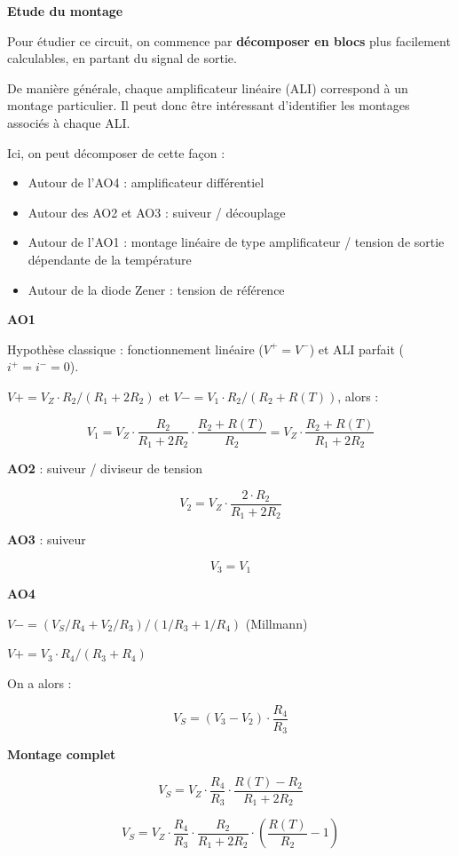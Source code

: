 \documentclass[a4paper,french]{paper}
\begin{document}

\textbf{Etude du montage}

Pour étudier ce circuit, on commence par \textbf{décomposer en blocs} plus facilement calculables, en partant du signal de sortie.

De manière générale, chaque amplificateur linéaire (ALI) correspond à un montage particulier. Il peut donc être intéressant d'identifier les montages associés à chaque ALI.

Ici, on peut décomposer de cette façon : 
\begin{itemize}
	\item Autour de l'AO4 : amplificateur différentiel 
	\item Autour des AO2 et AO3 : suiveur / découplage
	\item Autour de l'AO1 : montage linéaire de type amplificateur / tension de sortie dépendante de la température
	\item Autour de la diode Zener : tension de référence	
\end{itemize}


\textbf{AO1} 

Hypothèse classique : fonctionnement linéaire ($V^+ = V^-$) et ALI parfait ($i^+ = i^- = 0$).

$V+ = V_Z \cdot R_2 / (R_1 + 2 R_2)$ et $V- = V_1 \cdot R_2 / (R_2 + R(T))$, alors : 

$$V_1 = V_Z \cdot \frac{R_2}{R_1 + 2 R_2} \cdot \frac{R_2 + R(T)}{R_2} = V_Z \cdot \frac{R_2 + R(T)}{R_1 + 2 R_2}$$

\textbf{AO2} : suiveur / diviseur de tension

$$V_2 =  V_Z \cdot \frac{2 \cdot R_2}{R_1 + 2 R_2}$$

\textbf{AO3} : suiveur

$$V_3 = V_1$$

\textbf{AO4} 

$V- = (V_S/R_4 + V_2/R_3) / (1/R_3 + 1/R_4)$ (Millmann)

$V+ = V_3 \cdot R_4 / (R_3 + R_4)$

On a alors : 

$$V_S = (V_3 - V_2) \cdot \frac{R_4}{R_3}$$


\textbf{Montage complet}

$$V_S = V_Z \cdot \frac{R_4}{R_3} \cdot \frac{R(T) - R_2}{R_1 + 2 R_2}$$

$$V_S = V_Z \cdot \frac{R_4}{R_3} \cdot \frac{R_2}{R_1 + 2 R_2} \cdot (\frac{R(T)}{R_2} - 1)$$
\end{document}
